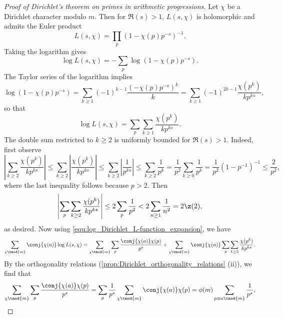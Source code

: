       \begin{proof}[Proof of Dirichlet's theorem on primes in arithmetic progressions]
          Let $\chi$ be a Dirichlet character modulo $m$. Then for $\Re(s) > 1$, $L(s,\chi)$ is holomorphic and admits the Euler product
          \[
            L(s,\chi) = \prod_{p}(1-\chi(p)p^{-s})^{-1}.
          \]
          Taking the logarithm gives
          \[
            \log L(s,\chi) = -\sum_{p}\log(1-\chi(p)p^{-s}).
          \]
          The Taylor series of the logarithm implies
          \[
            \log(1-\chi(p)p^{-s}) = \sum_{k \ge 1}(-1)^{k-1}\frac{(-\chi(p)p^{-s})^{k}}{k} = \sum_{k \ge 1}(-1)^{2k-1}\frac{\chi(p^{k})}{kp^{ks}},
          \]
          so that
          \begin{equation}\label{equ:log_Dirichlet_L-function_expansion}
            \log L(s,\chi) = \sum_{p}\sum_{k \ge 1}\frac{\chi(p^{k})}{kp^{ks}}.
          \end{equation}
          The double sum restricted to $k \ge 2$ is uniformly bounded for $\Re(s) > 1$. Indeed, first observe
          \[
            \left|\sum_{k \ge 2}\frac{\chi(p^{k})}{kp^{ks}}\right| \le \sum_{k \ge 2}\left|\frac{\chi(p^{k})}{kp^{ks}}\right| \le \sum_{k \ge 2}\left|\frac{1}{p^{ks}}\right| \le \sum_{k \ge 2}\frac{1}{p^{k}} = \frac{1}{p^{2}}\sum_{k \ge 0}\frac{1}{p^{k}} = \frac{1}{p^{2}}(1-p^{-1})^{-1} \le \frac{2}{p^{2}},
          \]
          where the last inequality follows because $p > 2$. Then
          \[
            \left|\sum_{p}\sum_{k \ge 2}\frac{\chi(p^{k})}{kp^{ks}}\right| \le 2\sum_{p}\frac{1}{p^{2}} < 2\sum_{n \ge 1}\frac{1}{n^{2}} = 2\z(2),
          \]
          as desired. Now using \cref{equ:log_Dirichlet_L-function_expansion}, we have
          \begin{equation}\label{equ:Dirichlet's_theorem_on_primes_in_arithmetric_progressions_1}
            \sum_{\chi \tmod{m}}\conj{\chi(a)}\log L(s,\chi) = \sum_{\chi \tmod{m}}\sum_{p}\frac{\conj{\chi(a)}\chi(p)}{p^{s}}+\sum_{\chi \tmod{m}}\conj{\chi(a)}\sum_{p}\sum_{k \ge 2}\frac{\chi(p^{k})}{kp^{ks}}.
          \end{equation}
          By the orthogonality relations (\cref{prop:Dirichlet_orthogonality_relations} (ii)), we find that
          \begin{equation}\label{equ:Dirichlet's_theorem_on_primes_in_arithmetric_progressions_2}
            \sum_{\chi \tmod{m}}\sum_{p}\frac{\conj{\chi(a)}\chi(p)}{p^{s}} = \sum_{p}\frac1{p^{s}}\sum_{\chi \tmod{m}}\conj{\chi(a)}\chi(p) = \phi(m)\sum_{p \equiv{a} \tmod{m}}\frac{1}{p^{s}},
          \end{equation}

\end{proof}
